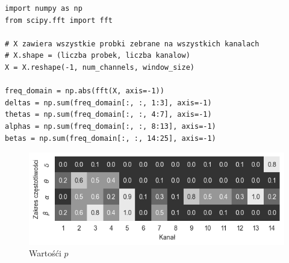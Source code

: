 \documentclass{./assets/wfis}
\begin{document}
\begin{lstlisting}[caption={Przejście do domeny częstotliwościowej},label={lst:moving-to-freq-domain}]
import numpy as np
from scipy.fft import fft

# X zawiera wszystkie probki zebrane na wszystkich kanalach
# X.shape = (liczba probek, liczba kanalow)
X = X.reshape(-1, num_channels, window_size)

freq_domain = np.abs(fft(X, axis=-1))
deltas = np.sum(freq_domain[:, :, 1:3], axis=-1)
thetas = np.sum(freq_domain[:, :, 4:7], axis=-1)
alphas = np.sum(freq_domain[:, :, 8:13], axis=-1)
betas = np.sum(freq_domain[:, :, 14:25], axis=-1)
\end{lstlisting}

\begin{figure}[h!]
    \centering
    \includegraphics[width=0.75\columnwidth]{thesis/assets/thinking_vs_waiting_pvalue.png}
    \caption{Wartośći $p$}
    \label{fig:thinking-vs-waiting-pvalue}
\end{figure}
\end{document}
